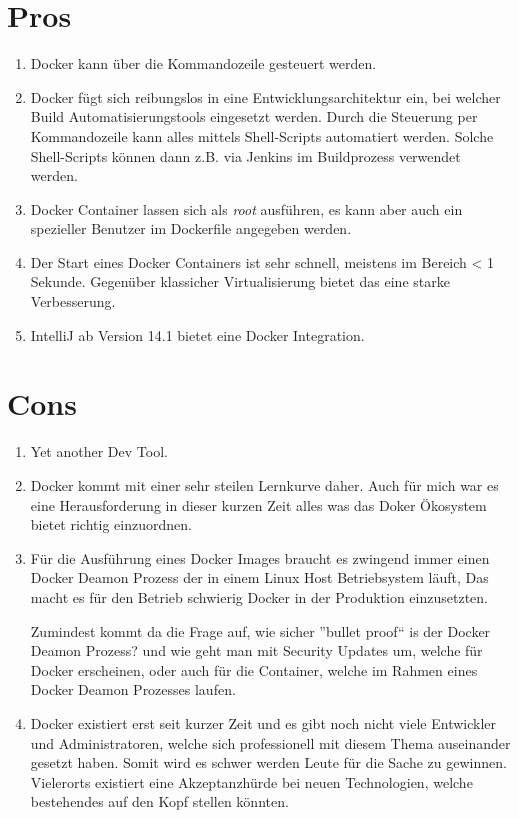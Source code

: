 \section{Pros}

\begin{enumerate}

\item Docker kann über die Kommandozeile gesteuert werden.

\item Docker fügt sich reibungslos in eine Entwicklungsarchitektur ein, bei welcher Build
Automatisierungstools eingesetzt werden. Durch die Steuerung per Kommandozeile kann alles
mittels Shell-Scripts automatiert werden. Solche Shell-Scripts können dann z.B. via Jenkins
im Buildprozess verwendet werden.

\item Docker Container lassen sich als \textit{root} ausführen, es kann aber auch ein spezieller
Benutzer im Dockerfile angegeben werden.

\item Der Start eines Docker Containers ist sehr schnell, meistens im Bereich < 1 Sekunde.
Gegenüber klassicher Virtualisierung bietet das eine starke Verbesserung.

\item IntelliJ ab Version 14.1 bietet eine Docker Integration.

\end{enumerate}

\section{Cons}

\begin{enumerate}

\item Yet another Dev Tool.

\item Docker kommt mit einer sehr steilen Lernkurve daher. Auch für mich war es eine Herausforderung
in dieser kurzen Zeit alles was das Doker Ökosystem bietet richtig einzuordnen.

\item Für die Ausführung eines Docker Images braucht es zwingend immer einen Docker Deamon Prozess der
in einem Linux Host Betriebsystem läuft, Das macht es für den Betrieb schwierig Docker in der
Produktion einzusetzten.

Zumindest kommt da die Frage auf, wie sicher ”bullet proof“ is der Docker Deamon Prozess? und wie
geht man mit Security Updates um, welche für Docker erscheinen, oder auch für die Container, welche
im Rahmen eines Docker Deamon Prozesses laufen.

\item Docker existiert erst seit kurzer Zeit und es gibt noch nicht viele Entwickler und
Administratoren, welche sich professionell mit diesem Thema auseinander gesetzt haben. Somit wird
es schwer werden Leute für die Sache zu gewinnen. Vielerorts existiert eine Akzeptanzhürde bei
neuen Technologien, welche bestehendes auf den Kopf stellen könnten.

\end{enumerate}